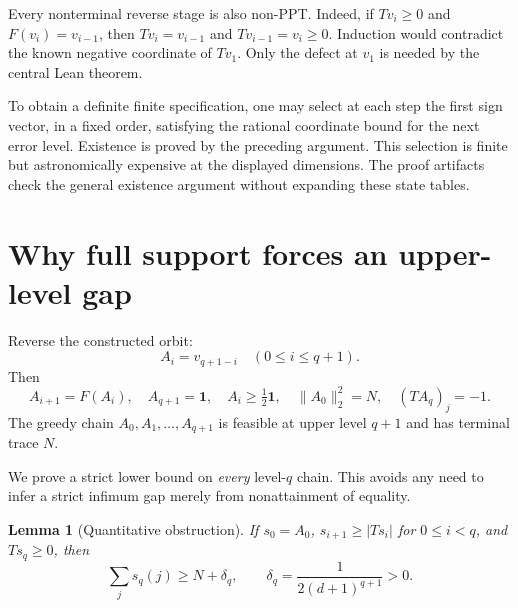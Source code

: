 \documentclass[11pt]{article}
\newtheorem{lemma}{Lemma}
\newcommand{\one}{\mathbf1}
\begin{document}
Every nonterminal reverse stage is also non-PPT. Indeed, if $Tv_i\ge0$
and $F(v_i)=v_{i-1}$, then $Tv_i=v_{i-1}$ and $Tv_{i-1}=v_i\ge0$.
Induction would contradict the known negative coordinate of $Tv_1$.
Only the defect at $v_1$ is needed by the central Lean theorem.

To obtain a definite finite specification, one may select at each step the
first sign vector, in a fixed order, satisfying the rational coordinate
bound for the next error level. Existence is proved by the preceding
argument. This selection is finite but astronomically expensive at the
displayed dimensions. The proof artifacts check the general existence
argument without expanding these state tables.

\section{Why full support forces an upper-level gap}
Reverse the constructed orbit:
\[
A_i=v_{q+1-i}\quad(0\le i\le q+1).
\]
Then
\begin{equation}\label{eq:forward}
A_{i+1}=F(A_i),\quad A_{q+1}=\one,\quad
A_i\ge\tfrac12\one,\quad \|A_0\|_2^2=N,\quad (TA_q)_j=-1.
\end{equation}
The greedy chain $A_0,A_1,\ldots,A_{q+1}$ is feasible at upper level $q+1$
and has terminal trace $N$.

We prove a strict lower bound on \emph{every} level-$q$ chain. This avoids
any need to infer a strict infimum gap merely from nonattainment of equality.

\begin{lemma}[Quantitative obstruction]\label{lem:gap}
If $s_0=A_0$, $s_{i+1}\ge|Ts_i|$ for $0\le i<q$, and $Ts_q\ge0$, then
\begin{equation}\label{eq:coarsegap}
\sum_js_q(j)\ge N+\delta_q,\qquad
\delta_q=\frac1{2(d+1)^{q+1}}>0.
\end{equation}
\end{lemma}
\end{document}
